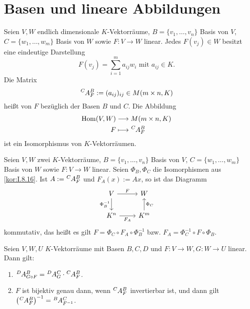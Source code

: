 \section{Basen und lineare Abbildungen}

\begin{satz}[Darstellungsmatrix]
	\label{satz:I.10.1}
	Seien $V,W$ endlich dimensionale $K$-Vektorräume, $B = \{v_1,\dots,v_n\}$ Basis von $V$, $C = \{w_1,\dots,w_m\}$ Basis von $W$ sowie $F \colon V \rightarrow W$ linear.
	Jedes $F(v_j) \in W$ besitzt eine eindeutige Darstellung
	\[
		F(v_j) = \sum_{i=1}^{m} a_{ij} w_i \text{ mit } a_{ij} \in K.
	\]
	Die Matrix
	\[
		\mat{A}{C}{B}{F} := (a_{ij})_{ij} \in M(m\times n,K)
	\]
	heißt  von $F$ bezüglich der Basen $B$ und $C$.
	Die Abbildung
	\begin{align*}
		\Hom(V,W) &\longrightarrow M(m \times n,K) \\
		F &\longmapsto \mat{A}{C}{B}{F}
	\end{align*}
	ist ein Isomorphismus von $K$-Vektorräumen.
\end{satz}

\setcounter{definition}{2}
\begin{lemma}
	\label{lemma:I.10.3}
	Seien $V,W$ zwei $K$-Vektorräume, $B = \{v_1,\dots,v_n\}$ Basis von $V$, $C = \{w_1,\dots,w_m\}$ Basis von $W$ sowie $F \colon V \rightarrow W$ linear.
	Seien $\Phi_B, \Phi_C$ die Isomorphismen aus \autoref{kor:I.8.16}.
	Ist $A := \mat{A}{C}{B}{F}$ und $F_A(x) := Ax$, so ist das Diagramm
	\[
		\begin{tikzcd}
			V \arrow[r,"F"] \arrow[d,"\Phi_B^{-1}"'] & W \\
			K^n \arrow[r,"F_A"'] & K^m \arrow[u,"\Phi_C"']
		\end{tikzcd}
	\]
	kommutativ, das heißt es gilt $F = \Phi_C \circ F_A \circ \Phi_B^{-1}$ bzw. $F_A = \Phi_C^{-1} \circ F \circ \Phi_B$.
\end{lemma}

\begin{satz}
	\label{satz:I.10.4}
	Seien $V,W,U$ $K$-Vektorräume mit Basen $B,C,D$ und $F\colon V \rightarrow W, G \colon W \rightarrow U$ linear.
	Dann gilt:
	\begin{enumerate}[(1)]
		\item	$\mat{A}{D}{B}{G \circ F} = \mat{A}{D}{C}{G} \cdot \mat{A}{C}{B}{F}$.
		\item $F$ ist bijektiv genau dann, wenn $\mat{A}{C}{B}{F}$ invertierbar ist, und dann gilt $\enb{\mat{A}{C}{B}{F}}^{-1} = \mat{A}{B}{C}{F^{-1}}$.
	\end{enumerate}
\end{satz}

